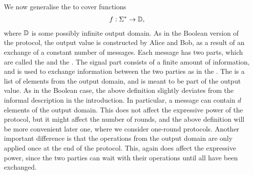 \AP
We now generalise the  to cover functions 
\begin{align*}
f : \Sigma^* \to \mathbb D,
\end{align*}
where $\mathbb D$ is some possibly infinite output domain. As in the Boolean
version of the protocol, the output value is constructed by Alice and Bob, as a
result of an exchange of a constant number of messages. Each message has two
parts, which are called the  and the . The
signal part consists of a finite amount of information, and is used to exchange
information between the two parties as in the . The 
is a list of elements from the  output domain, and  is meant to be part of the
output value. As in the Boolean case, the above definition slightly deviates
from the informal description in the introduction. In particular, a message can
contain $d$ elements of the output domain. This does not affect the expressive
power of the protocol, but it might affect the number of rounds, and the above
definition will be more convenient later one, where we consider one-round
protocols. Another important difference is that the operations from the output
domain are only applied once at the end of the protocol. This, again does
affect the expressive power, since the two parties can wait with their
operations until all  have been exchanged.  

